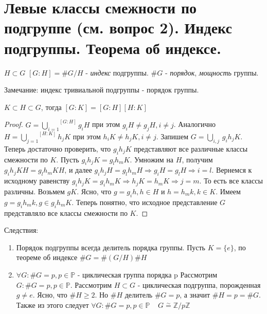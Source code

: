 \section{Левые классы смежности по подгруппе (см. вопрос 2). Индекс подгруппы. Теорема об индексе.}

\begin{defn}
  $ H \subset G $ \newline
  $ [G:H] = \#G/H $ - \emph{индекс} подгруппы. \newline
  $ \#G $ - \emph{порядок}, \emph{мощность} группы. 
\end{defn}

Замечание: индекс тривиальной подгруппы - порядок группы.

\begin{thm}
  $ K \subset H \subset G $, \newline тогда $ [G:K] = [G:H][H:K] $
\end{thm}
\begin{proof}
  $ G = \overset{[G:H]}{\underset{i=1}{\bigcup}} g_{i}H $ при этом $ g_{i}H \ne g_{j}H, i \ne j $. 
  Аналогично $ H = \overset{[H:K]}{\underset{j=1}\bigcup} h_{j}K $ при этом $ h_{i}K \ne h_{j}K, i \ne j $. 
  Запишем $ G = \underset{i, j}\bigcup \, g_{i}h_{j}K $. \newline
  Теперь достаточно проверить, что $ g_{i}h_{j}K $ представляют все различные классы смежности по $ K $.
  Пусть $ g_{i}h_{j}K = g_{l}h_{m}K $. Умножим на $ H $, получим $ g_{i}h_{j}KH = g_{l}h_{m}KH $, и далее
  $ g_{i}h_{j}H = g_{l}h_{m}H \Rightarrow  g_{i}H = g_{l}H \Rightarrow i = l $. Вернемся к исходному равенству
  $ g_{i}h_{j}K = g_{i}h_{m}K \Rightarrow h_{j}K = h_{m}K \Rightarrow j = m $. То есть все классы различны. \newline
  Возьмем $ gK $. Ясно, что $ g = g_{i}h, h \in H $ и $ h = h_{m}k, k \in K $. Имеем 
  $ g = g_{i}h_{m}k, g \in g_{i}h_{m}K $. Теперь понятно, что исходное представление $ G $ представляло все классы
  смежности по $ K $.
\end{proof}

Следствия:

\begin{enumerate}
  \item Порядок подгруппы всегда делитель порядка группы. \newline
    Пусть $ K = \{e\} $, по теореме об индексе $ \#G = \#(G/H)\#H $
  \item $ \forall G : \#G = p, p \in \mathbb{P} $ - циклическая группа порядка p \newline
    Рассмотрим $ G : \#G = p, p \in \mathbb{P} $. Рассмотрим $ H \subset G $ - циклическая подгруппа,
    порожденная $ g \ne e $. Ясно, что $ \#H \ge 2 $. Но $ \#H $ делитель $ \#G = p $, а значит
    $ \#H = p = \# G $. Также из этого следует $ \forall G : \#G = p, p \in \mathbb{P} \;\;\;\; 
    G \overset\sim{=} \mathbb{Z}/p\mathbb{Z} $
\end{enumerate}
